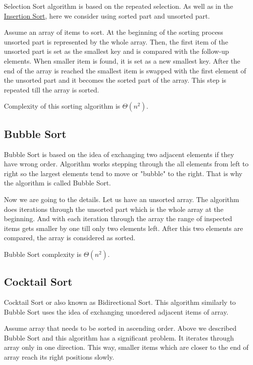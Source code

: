 \documentclass[
  field=inf,
  biblatex,
  language=english,
  glossaries,
  index
]{kidiplom}
\begin{document}
Selection Sort algorithm is based on the repeated selection. As well as in the \hyperref[sec:insertion]{Insertion Sort}, here we consider using sorted part and unsorted part.

Assume an array of items to sort. At the beginning of the sorting process unsorted part is represented by the whole array. Then, the first item of the unsorted part is set as the smallest key and is compared with the follow-up elements. When smaller item is found, it is set as a new smallest key. After the end of the array is reached the smallest item is swapped with the first element of the unsorted part and it becomes the sorted part of the array. This step is repeated till the array is sorted.

Complexity of this sorting algorithm is $\Theta(n^2)$.

\subsection{Bubble Sort}
\label{sec:bubble}
Bubble Sort is based on the idea of exchanging two adjacent elements if they have wrong order. Algorithm works stepping through the all elements from left to right so the largest elements tend to move or "bubble" to the right. That is why the algorithm is called Bubble Sort.

Now we are going to the details. Let us have an unsorted array. The algorithm does iterations through the unsorted part which is the whole array at the beginning. And with each iteration through the array the range of inspected items gets smaller by one till only two elements left. After this two elements are compared, the array is considered as sorted.

Bubble Sort complexity is $\Theta(n^2)$.

\subsection{Cocktail Sort}

Cocktail Sort or also known as Bidirectional Sort. This algorithm similarly to Bubble Sort uses the idea of exchanging unordered adjacent items of array. 

Assume array that needs to be sorted in ascending order. Above we described Bubble Sort and this algorithm has a significant problem. It iterates through array only in one direction. This way, smaller items which are closer to the end of array reach its right positions slowly.
\end{document}
